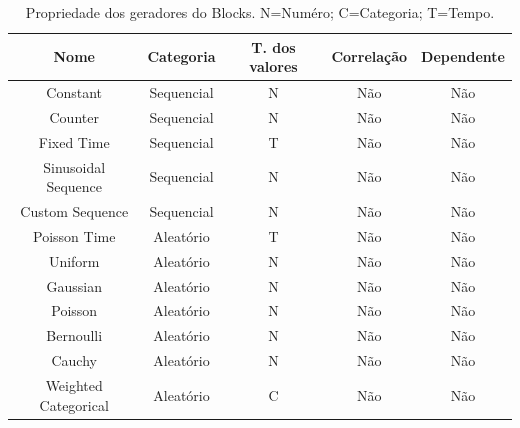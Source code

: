 \documentclass[
	12pt,				%
	openright,			%
	oneside,			%
	a4paper,			%
	english,			%
	brazil				%
	]{abntex2}
\begin{document}
		\begin{table}[h]
			\centering
			\caption{Propriedade dos geradores do Blocks. 
				N=Numéro;
				C=Categoria;
				T=Tempo.
			}
			\vspace{0.5cm}
			\label{table: Propriedade Geradores Blocks}
			\begin{tabular}{c|c|c|c|c}
			
				Nome                 & Categoria  & T. dos valores                                            & Correlação & Dependente \\ %
				\hline %
				Constant             & Sequencial & N                                         & Não        & Não \\
				Counter              & Sequencial & N                                         & Não        & Não \\
				Fixed Time           & Sequencial & T                                         & Não        & Não \\
				Sinusoidal Sequence  & Sequencial & N                                         & Não        & Não \\
				Custom Sequence      & Sequencial & N                                         & Não        & Não \\
				Poisson Time         & Aleatório  & T                                         & Não        & Não \\
				Uniform              & Aleatório  & N                                         & Não        & Não \\
				Gaussian             & Aleatório  & N                                         & Não        & Não \\
				Poisson              & Aleatório  & N                                         & Não        & Não \\
				Bernoulli            & Aleatório  & N                                         & Não        & Não \\
				Cauchy               & Aleatório  & N                                         & Não        & Não \\
				Weighted Categorical & Aleatório  & C                                         & Não        & Não \\

\end{tabular}
\end{table}
\end{document}
